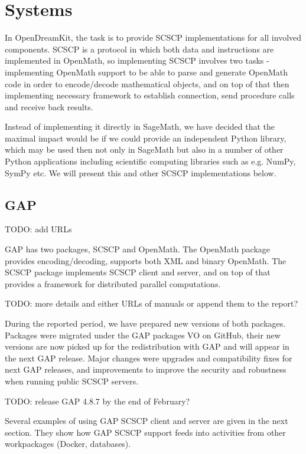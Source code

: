 \documentclass{deliverablereport}
\begin{document}
\section{Systems}\label{systems}

In OpenDreamKit, the task is to provide SCSCP implementations
for all involved components. SCSCP is a protocol in which 
both data and instructions are implemented in OpenMath, so
implementing SCSCP involves two tasks - implementing OpenMath
support to be able to parse and generate OpenMath code in order
to encode/decode mathematical objects, and on top of that 
then implementing necessary framework to establish connection,
send procedure calls and receive back results.

Instead of implementing it directly in SageMath, we have
decided that the maximal impact would be if we could provide
an independent Python library, which may be used then not
only in SageMath but also in a number of other Python applications
including scientific computing libraries such as e.g. NumPy,
SymPy etc. We will present this and other SCSCP implementations
below.


\subsection{GAP}

TODO: add URLs

GAP has two packages, SCSCP and OpenMath. The OpenMath package
provides encoding/decoding, supports both XML and binary OpenMath.
The SCSCP package implements SCSCP client and server, and on top of
that provides a framework for distributed parallel computations.

TODO: more details and either URLs of manuals or append them to the report?

During the reported period, we have prepared new versions of 
both packages. Packages were migrated under the GAP packages VO
on GitHub, their new versions are now picked up for the redistribution
with GAP and will appear in the next GAP release. Major changes
were upgrades and compatibility fixes for next GAP releases, 
and improvements to improve the security and robustness when
running public SCSCP servers. 

TODO: release GAP 4.8.7 by the end of February?

Several examples of using GAP SCSCP client and server are given
in the next section. They show how GAP SCSCP support feeds into
activities from other workpackages (Docker, databases).
\end{document}
